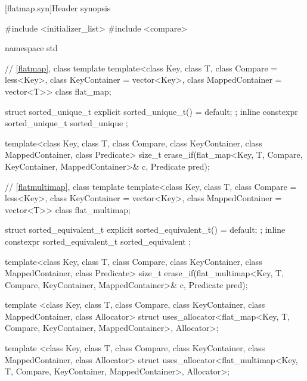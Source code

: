 \setcounter{subsection}{3}
\begin{addedblock}
[flatmap.syn]{Header  synopsis}%
%

\begin{codeblock}
#include <initializer_list>
#include <compare>

namespace std {
  // \ref{flatmap}, class template 
  template<class Key, class T, class Compare = less<Key>,
           class KeyContainer = vector<Key>, class MappedContainer = vector<T>>
    class flat_map;

  struct sorted_unique_t { explicit sorted_unique_t() = default; };
  inline constexpr sorted_unique_t sorted_unique {};

  template<class Key, class T, class Compare, class KeyContainer, class MappedContainer,
           class Predicate>
    size_t erase_if(flat_map<Key, T, Compare, KeyContainer, MappedContainer>& c,
                    Predicate pred);

  // \ref{flatmultimap}, class template 
  template<class Key, class T, class Compare = less<Key>,
           class KeyContainer = vector<Key>, class MappedContainer = vector<T>>
    class flat_multimap;

  struct sorted_equivalent_t { explicit sorted_equivalent_t() = default; };
  inline constexpr sorted_equivalent_t sorted_equivalent {};

  template<class Key, class T, class Compare, class KeyContainer, class MappedContainer,
           class Predicate>
    size_t erase_if(flat_multimap<Key, T, Compare, KeyContainer, MappedContainer>& c,
                    Predicate pred);

  template <class Key, class T, class Compare, class KeyContainer, class MappedContainer,
            class Allocator>
    struct uses_allocator<flat_map<Key, T, Compare, KeyContainer, MappedContainer>,
                          Allocator>;

  template <class Key, class T, class Compare, class KeyContainer, class MappedContainer,
            class Allocator>
    struct uses_allocator<flat_multimap<Key, T, Compare, KeyContainer, MappedContainer>,
                          Allocator>;

}
\end{codeblock}
\end{addedblock}

\noindent\makebox[\linewidth]{\rule{\textwidth}{0.4pt}}

